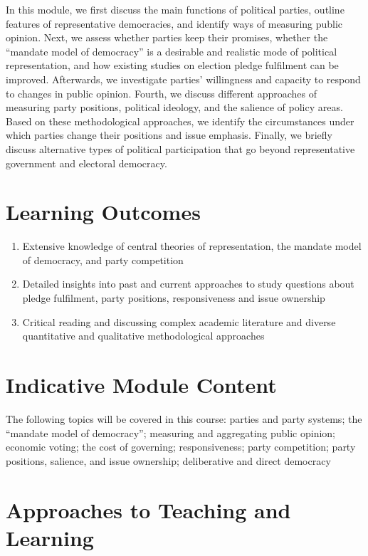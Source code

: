 \documentclass[abstract=on,parskip=full,headings=standardclasses,fontsize=11pt,paper=a4]{scrartcl}
\begin{document}
In this module, we first  discuss the main functions of political parties, outline features of representative democracies, and identify ways of measuring public opinion. Next, we assess whether parties keep their promises, whether the ``mandate model of democracy'' is a desirable and realistic mode of political representation, and how existing studies on election pledge fulfilment can be improved. Afterwards, we investigate parties'  willingness and capacity to respond to changes in public opinion. Fourth, we  discuss different approaches of measuring party positions, political ideology, and the salience of policy areas. Based on these methodological approaches, we identify the circumstances under which parties change their positions and issue emphasis. Finally, we briefly discuss  alternative types of political  participation that go beyond representative government and electoral democracy. 


\section*{Learning Outcomes}

\begin{enumerate}
\item Extensive knowledge of central theories of representation,  the mandate model of democracy, and party competition
\item Detailed insights into past and current approaches to study questions about pledge fulfilment, party positions, responsiveness and issue ownership 
\item Critical reading and discussing  complex academic literature and diverse  quantitative and qualitative methodological approaches
\end{enumerate}

\section*{Indicative Module Content}

The following topics will be covered in this course: parties and party systems; the ``mandate model of democracy''; measuring and aggregating public opinion; economic voting; the cost of governing; responsiveness; party competition; party positions, salience, and issue ownership; deliberative and direct democracy 


\section*{Approaches to Teaching and Learning}
\end{document}
